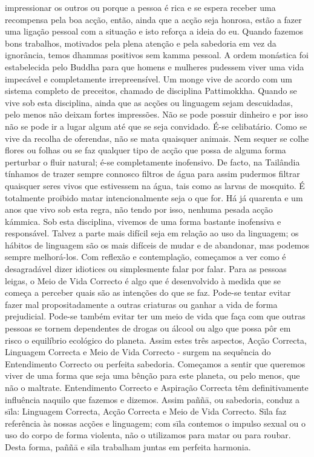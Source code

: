 impressionar os outros ou porque a pessoa é rica e se espera
receber uma recompensa pela boa acção, então, ainda que a
acção seja honrosa, estão a fazer uma ligação pessoal com a
situação e isto reforça a ideia do eu. Quando fazemos bons
trabalhos, motivados pela plena atenção e pela sabedoria
em vez da ignorância, temos dhammas positivos sem kamma
pessoal.
A ordem monástica foi estabelecida pelo Buddha para
que homens e mulheres pudessem viver uma vida impecável
e completamente irrepreensível. Um monge vive de acordo
com um sistema completo de preceitos, chamado de disciplina
Pattimokkha. Quando se vive sob esta disciplina, ainda que as
acções ou linguagem sejam descuidadas, pelo menos não
deixam fortes impressões. Não se pode possuir dinheiro e por
isso não se pode ir a lugar algum até que se seja convidado.
É-se celibatário. Como se vive da recolha de oferendas, não
se mata quaisquer animais. Nem sequer se colhe flores ou
folhas ou se faz qualquer tipo de acção que possa de alguma
forma perturbar o fluir natural; é-se completamente inofensivo.
De facto, na Tailândia tínhamos de trazer sempre connosco
filtros de água para assim pudermos filtrar quaisquer seres
vivos que estivessem na água, tais como as larvas de mosquito.
É totalmente proibido matar intencionalmente seja o que for.
Há já quarenta e um anos que vivo sob esta regra, não
tendo por isso, nenhuma pesada acção kámmica. Sob esta
disciplina, vivemos de uma forma bastante inofensiva e
responsável. Talvez a parte mais difícil seja em relação ao uso
da linguagem; os hábitos de linguagem são os mais difíceis de
mudar e de abandonar, mas podemos sempre melhorá-los.
Com reflexão e contemplação, começamos a ver como é
desagradável dizer idiotices ou simplesmente falar por falar.
Para as pessoas leigas, o Meio de Vida Correcto é algo
que é desenvolvido à medida que se começa a perceber quais
são as intenções do que se faz. Pode-se tentar evitar fazer mal
propositadamente a outras criaturas ou ganhar a vida de
forma prejudicial. Pode-se também evitar ter um meio de vida
que faça com que outras pessoas se tornem dependentes de
drogas ou álcool ou algo que possa pôr em risco o equilíbrio
ecológico do planeta.
Assim estes três aspectos, Acção Correcta, Linguagem
Correcta e Meio de Vida Correcto - surgem na sequência do
Entendimento Correcto ou perfeita sabedoria. Começamos a
sentir que queremos viver de uma forma que seja uma bênção
para este planeta, ou pelo menos, que não o maltrate.
Entendimento Correcto e Aspiração Correcta têm
definitivamente influência naquilo que fazemos e dizemos.
Assim paññā, ou sabedoria, conduz a sīla: Linguagem
Correcta, Acção Correcta e Meio de Vida Correcto. Sīla faz
referência às nossas acções e linguagem; com sīla contemos
o impulso sexual ou o uso do corpo de forma violenta, não o
utilizamos para matar ou para roubar. Desta forma, paññā e
sīla trabalham juntas em perfeita harmonia.


